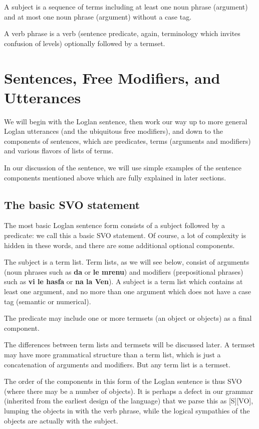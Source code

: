 \documentclass[12pt]{book}
\begin{document}
{A subject is a sequence of terms including at least one noun phrase (argument) and at most one noun phrase (argument) without a case tag.

A verb phrase is a verb (sentence predicate, again, terminology which invites confusion of levels) optionally followed by a termset.



\section{Sentences, Free Modifiers, and Utterances}

We will begin with the Loglan sentence, then work our way up to more general Loglan utterances (and the ubiquitous free modifiers), and down to the components of sentences, which are predicates, terms (arguments and modifiers) and various flavors of lists of terms.

In our discussion of the sentence, we will use simple examples of the sentence components mentioned above which are fully explained in later sections.

\subsection{The basic SVO statement}

The most basic Loglan sentence form consists of a subject followed by a predicate:  we call this a basic SVO statement.  Of course, a lot of complexity is hidden in these words,
and there are some additional optional components.

The subject is a term list.  Term lists, as we will see below, consist of arguments (noun phrases such as {\bf da} or {\bf le mrenu}) and modifiers (prepositional phrases) such as {\bf vi le hasfa} or {\bf na la Ven}).  A subject is a term list which contains at least one argument, and no more than one argument which does not have a case tag (semantic or numerical).  

The predicate may include one or more termsets (an object or objects) as a final component.

The differences between term lists and termsets will be discussed later.  A termset may have more grammatical structure than a term list, which
is just a concatenation of arguments and modifiers.  But any term list is a termset.

The order of the components in this form of the Loglan sentence is thus SVO (where there may be a number of objects).  It is perhaps a defect in our grammar
(inherited from the earliest design of the language) that we parse this as [S][VO], lumping the objects in with the verb phrase, while the logical sympathies of the objects are actually with the subject.

}
\end{document}
